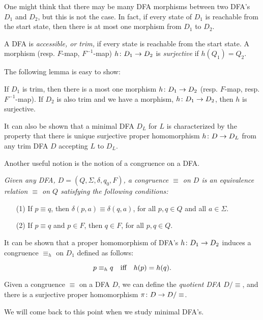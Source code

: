 \medskip
One might think that there may be many DFA morphisms
between two DFA's $D_1$ and $D_2$, but  this is not the case.
In fact, if every state of $D_1$ is reachable from the start state,
then there is at most one morphism from $D_1$ to $D_2$. 

\medskip
A DFA is {\it  accessible, or trim,\/} if every state is reachable from 
the start state. 
A morphism (resp. $F$-map, $F^{-1}$-map)
$h\colon D_1\rightarrow D_2$  is {\it  surjective\/} 
if $h(Q_1) = Q_2$.

\medskip
The following lemma is easy to show:
\begin{lemma}
\label{DFAmaplem2}
If $D_1$ is trim, then there is a most 
one morphism $h\colon D_1\rightarrow D_2$  
(resp. $F$-map, resp. $F^{-1}$-map).
If $D_2$ is also trim and we have a
morphism, $h\colon D_1\rightarrow D_2$, then $h$ is surjective.  
\end{lemma}

\medskip
It can also be shown that a minimal DFA $D_L$ for $L$ is 
characterized by the property that there is unique surjective
proper homomorphism
$h\colon D\rightarrow D_L$ from any trim DFA $D$ accepting $L$ to $D_L$.

\medskip
Another useful notion is the notion of a congruence on a DFA.

\begin{defin}
\label{DFcongdef}
{\em 
Given any  DFA,
$D = (Q, \Sigma, \delta, q_{0}, F)$,
a {\it  congruence $\equiv$ on $D$\/} is an equivalence
relation $\equiv$ on $Q$ satisfying the following
conditions:
\begin{enumerate}
\item[(1)] 
If $p \equiv q$, then $\delta(p, a)\equiv \delta(q, a)$,
for all $p, q\in Q$ and all $a\in \Sigma$.
\item[(2)] 
If $p \equiv q$ and $p\in F$, then $q\in F$,
for all $p, q\in Q$.
\end{enumerate}
}
\end{defin}

\medskip
It can be shown that
a proper  homomorphism of DFA's
$h\colon D_1\rightarrow D_2$ induces a
congruence $\equiv_h$ on $D_1$ defined as follows:

\medskip
$$p\equiv_h q\quad
\hbox{iff}\quad
h(p) = h(q).$$

\medskip
Given a congruence $\equiv$ on a DFA $D$, we can define
the {\it  quotient DFA $D/\equiv$\/}, and there is a 
surjective proper
homomorphism $\pi\colon D\rightarrow D/\equiv$.

\medskip
We will come back to
this point when we study minimal DFA's.



